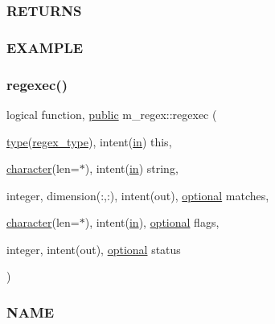 \subsubsection*{R\+E\+T\+U\+R\+NS}

\subsubsection*{E\+X\+A\+M\+P\+LE}\mbox{\label{namespacem__regex_a44394d605b1a98fb246bc4622a08f878}} 
\subsubsection{\texorpdfstring{regexec()}{regexec()}}
{\footnotesize\ttfamily logical function, \hyperlink{M__stopwatch_83_8txt_a2f74811300c361e53b430611a7d1769f}{public} m\+\_\+regex\+::regexec (\begin{DoxyParamCaption}\item[{\hyperlink{stop__watch_83_8txt_a70f0ead91c32e25323c03265aa302c1c}{type}(\hyperlink{structm__regex_1_1regex__type}{regex\+\_\+type}), intent(\hyperlink{M__journal_83_8txt_afce72651d1eed785a2132bee863b2f38}{in})}]{this,  }\item[{\hyperlink{option__stopwatch_83_8txt_abd4b21fbbd175834027b5224bfe97e66}{character}(len=$\ast$), intent(\hyperlink{M__journal_83_8txt_afce72651d1eed785a2132bee863b2f38}{in})}]{string,  }\item[{integer, dimension(\+:,\+:), intent(out), \hyperlink{option__stopwatch_83_8txt_aa4ece75e7acf58a4843f70fe18c3ade5}{optional}}]{matches,  }\item[{\hyperlink{option__stopwatch_83_8txt_abd4b21fbbd175834027b5224bfe97e66}{character}(len=$\ast$), intent(\hyperlink{M__journal_83_8txt_afce72651d1eed785a2132bee863b2f38}{in}), \hyperlink{option__stopwatch_83_8txt_aa4ece75e7acf58a4843f70fe18c3ade5}{optional}}]{flags,  }\item[{integer, intent(out), \hyperlink{option__stopwatch_83_8txt_aa4ece75e7acf58a4843f70fe18c3ade5}{optional}}]{status }\end{DoxyParamCaption})}



\subsubsection*{N\+A\+ME}

